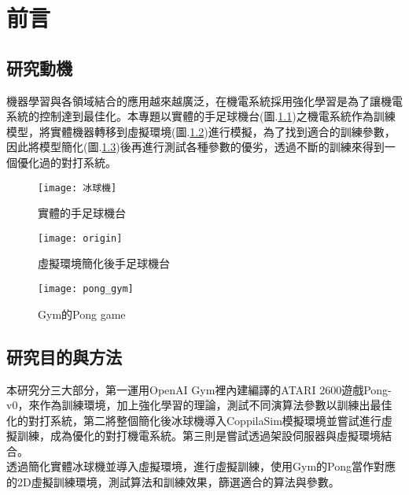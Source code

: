 \chapter{前言}
\renewcommand{\baselinestretch}{10.0} %
\setcounter{page}{1}  %
\fontsize{14pt}{2.5pt}\sectionef
\section{研究動機}
機器學習與各領域結合的應用越來越廣泛，在機電系統採用強化學習是為了讓機電系統的控制達到最佳化。本專題以實體的手足球機台(圖.\ref{fig.冰球機})之機電系統作為訓練模型，將實體機器轉移到虛擬環境(圖.\ref{fig.模擬冰球機})進行模擬，為了找到適合的訓練參數，因此將模型簡化(圖.\ref{fig.pong_gym})後再進行測試各種參數的優劣，透過不斷的訓練來得到一個優化過的對打系統。\\

\begin{figure}[hbt!]
\begin{center}
\texttt{[image: 冰球機]}
\caption{\Large 實體的手足球機台}\label{fig.冰球機}
\end{center}
\end{figure}
\begin{figure}[hbt!]
\begin{center}
\texttt{[image: origin]}
\caption{\Large 虛擬環境簡化後手足球機台}\label{fig.模擬冰球機}
\end{center}
\end{figure}
\begin{figure}[hbt!]
\begin{center}
\texttt{[image: pong\_gym]}
\caption{\Large Gym的Pong game}\label{fig.pong_gym}
\end{center}
\end{figure}


\section{研究目的與方法}
本研究分三大部分，第一運用OpenAI Gym裡內建編譯的ATARI 2600遊戲Pong-v0，來作為訓練環境，加上強化學習的理論，測試不同演算法參數以訓練出最佳化的對打系統，第二將整個簡化後冰球機導入CoppilaSim模擬環境並嘗試進行虛擬訓練，成為優化的對打機電系統。第三則是嘗試透過架設伺服器與虛擬環境結合。\\
 
透過簡化實體冰球機並導入虛擬環境，進行虛擬訓練，使用Gym的Pong當作對應的2D虛擬訓練環境，測試算法和訓練效果，篩選適合的算法與參數。\\

